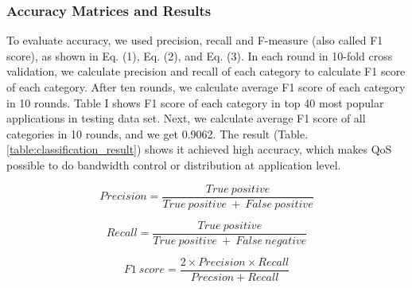 \documentclass[journal]{IEEEtran}
\begin{document}
\subsubsection{Accuracy Matrices and Results}
To evaluate accuracy, we used precision, recall and F-measure (also called F1 score),
as shown in Eq. (1), Eq. (2), and Eq. (3)\cite{muc4}. In each round in 10-fold cross validation,
we calculate precision and recall of each category to calculate F1 score of each category.
After ten rounds, we calculate average F1 score of each category in 10 rounds. Table I shows F1 score of each category in top 40 most popular applications in testing data set. Next, we calculate average F1 score of all categories in 10 rounds, and we get 0.9062. The result (Table. \ref{table:classification_result}) shows it achieved high accuracy, which makes QoS possible to do bandwidth control or distribution at application level.


\begin{equation}
\label{eqn_1}
Precision = \dfrac{True\ positive}{True\ positive\ +\ False\ positive}
\end{equation}

\begin{equation}
\label{eqn_2}
Recall = \dfrac{True\ positive}{True\ positive\ +\ False\ negative}
\end{equation}

\begin{equation}
\label{eqn_3}
F1\ score = \dfrac{2\times Precision\times Recall}{Precsion + Recall}
\end{equation}
\end{document}
